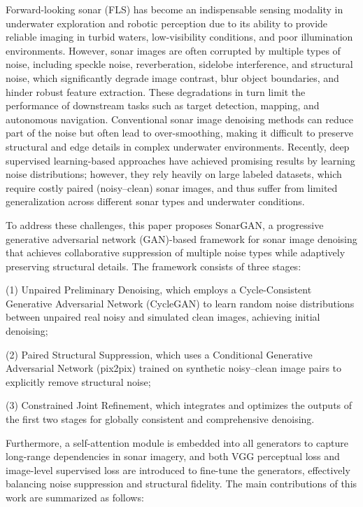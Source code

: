 \begin{eabstract}
Forward-looking sonar (FLS) has become an indispensable sensing modality in underwater exploration and robotic perception due to its ability 
to provide reliable imaging in turbid waters, low-visibility conditions, and poor illumination environments. However, sonar images are often 
corrupted by multiple types of noise, including speckle noise, reverberation, sidelobe interference, and structural noise, which significantly 
degrade image contrast, blur object boundaries, and hinder robust feature extraction. These degradations in turn limit the performance of 
downstream tasks such as target detection, mapping, and autonomous navigation. Conventional sonar image denoising methods can reduce part of 
the noise but often lead to over-smoothing, making it difficult to preserve structural and edge details in complex underwater environments. 
Recently, deep supervised learning-based approaches have achieved promising results by learning noise distributions; however, they rely heavily 
on large labeled datasets, which require costly paired (noisy–clean) sonar images, and thus suffer from limited generalization across 
different sonar types and underwater conditions.

To address these challenges, this paper proposes SonarGAN, a progressive generative adversarial network (GAN)-based framework for sonar image 
denoising that achieves collaborative suppression of multiple noise types while adaptively preserving structural details. The framework 
consists of three stages:

(1) Unpaired Preliminary Denoising, which employs a Cycle-Consistent Generative Adversarial Network (CycleGAN) to learn random noise distributions between unpaired real noisy and simulated clean images, achieving initial denoising;

(2) Paired Structural Suppression, which uses a Conditional Generative Adversarial Network (pix2pix) trained on synthetic noisy–clean image pairs to explicitly remove structural noise;

(3) Constrained Joint Refinement, which integrates and optimizes the outputs of the first two stages for globally consistent and comprehensive denoising.

Furthermore, a self-attention module is embedded into all generators to capture long-range dependencies in sonar imagery, and both VGG perceptual 
loss and image-level supervised loss are introduced to fine-tune the generators, effectively balancing noise suppression and structural fidelity. 
The main contributions of this work are summarized as follows:


\end{eabstract}
